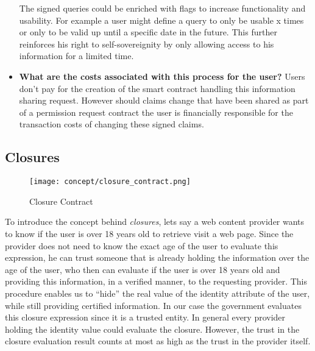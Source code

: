\begin{itemize}
The signed queries could be enriched with flags to increase functionality and usability. For example a user might define a query to only be usable x times or only to be valid up until a specific date in the future.
This further reinforces his right to self-sovereignity by only allowing access to his information for a limited time. 
\item \label{design_pecularity_four} \textbf{What are the costs associated with this process for the user?}
Users don't pay for the creation of the smart contract handling this information sharing request. However should claims change that have been shared as part of a permission request contract the user is financially responsible for the transaction costs of changing these signed claims.
\end{itemize}




\subsection{Closures}
\begin{figure}[ht]
\centering
\texttt{[image: concept/closure\_contract.png]}
\caption{Closure Contract}
\label{fig:closure}
\end{figure}

To introduce the concept behind \textit{closures}, lets say a web content provider wants to know if the user is over 18 years old to retrieve visit a web page.  Since the provider does not need to know the exact age of the user to evaluate this expression, he can trust someone that is already holding the information over the age of the user, who then can evaluate if the user is over 18 years old and providing this information, in a verified manner, to the requesting provider. This procedure enables us to “hide” the real value of the identity attribute of the user, while still providing certified information. In our case the government evaluates this closure expression since it is a trusted entity. In general every provider holding the identity value could evaluate the closure. However, the trust in the closure evaluation result counts at most as high as the trust in the provider itself. 

